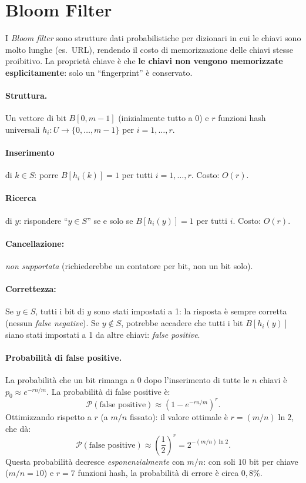 \documentclass[12pt, a4paper, oneside]{book}
\theoremstyle{plain}
\theoremstyle{definition}
\theoremstyle{remark}
\begin{document}
\section{Bloom Filter}

I \emph{Bloom filter} sono strutture dati probabilistiche per dizionari in cui le chiavi sono molto lunghe (es.\ URL), rendendo il costo di memorizzazione delle chiavi stesse proibitivo. La proprietà chiave è che \textbf{le chiavi non vengono memorizzate esplicitamente}: solo un ``fingerprint'' è conservato.

\paragraph{Struttura.} Un vettore di bit $B[0, m-1]$ (inizialmente tutto a 0) e $r$ funzioni hash universali $h_i : U \to \{0, \ldots, m-1\}$ per $i = 1, \ldots, r$.

\paragraph{Inserimento} di $k \in S$: porre $B[h_i(k)] = 1$ per tutti $i = 1, \ldots, r$. Costo: $O(r)$.

\paragraph{Ricerca} di $y$: rispondere ``$y \in S$'' se e solo se $B[h_i(y)] = 1$ per tutti $i$. Costo: $O(r)$.

\paragraph{Cancellazione:} \emph{non supportata} (richiederebbe un contatore per bit, non un bit solo).

\paragraph{Correttezza:} Se $y \in S$, tutti i bit di $y$ sono stati impostati a 1: la risposta è sempre corretta (nessun \emph{false negative}). Se $y \notin S$, potrebbe accadere che tutti i bit $B[h_i(y)]$ siano stati impostati a 1 da altre chiavi: \emph{false positive}.

\paragraph{Probabilità di false positive.} La probabilità che un bit rimanga a 0 dopo l'inserimento di tutte le $n$ chiavi è $p_0 \approx e^{-rn/m}$. La probabilità di false positive è:
\[
\mathcal{P}(\text{false positive}) \approx \left(1 - e^{-rn/m}\right)^r.
\]
Ottimizzando rispetto a $r$ (a $m/n$ fissato): il valore ottimale è $r = (m/n)\ln 2$, che dà:
\[
\mathcal{P}(\text{false positive}) \approx \left(\frac{1}{2}\right)^r = 2^{-(m/n)\ln 2}.
\]
Questa probabilità decresce \emph{esponenzialmente} con $m/n$: con soli $10$ bit per chiave ($m/n = 10$) e $r = 7$ funzioni hash, la probabilità di errore è circa $0{,}8\%$.
\end{document}

